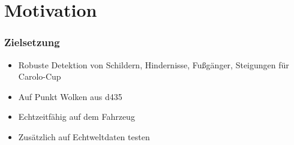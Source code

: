 \section{Motivation}
\begin{frame}
    \frametitle{Zielsetzung}
    \begin{itemize}
        \item Robuste Detektion von Schildern, Hindernisse, Fußgänger, Steigungen für Carolo-Cup
            \pause
        \item Auf Punkt Wolken aus \acl{d435}
            \pause
        \item Echtzeitfähig auf dem Fahrzeug
            \pause
        \item Zusätzlich auf Echtweltdaten testen
    \end{itemize}
\end{frame}
